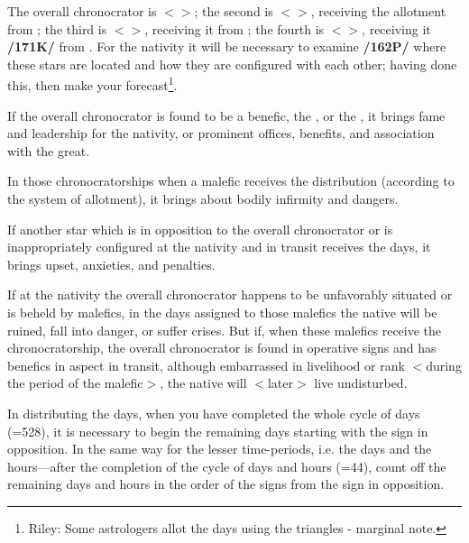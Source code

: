 The overall chronocrator is \Jupiter\xspace $<$\Pisces$>$; the second is \Mercury\xspace $<$\Gemini$>$, receiving the allotment from \Jupiter; the third is \Mars $<$\Scorpio$>$, receiving it from \Mercury; the fourth is \Venus $<$\Taurus$>$, receiving it \textbf{/171K/} from \Mars. For the nativity it will be necessary to examine \textbf{/162P/} where these stars are located and how they are configured with each other; having done this, then make your forecast\footnote{Riley: Some astrologers allot the days using the triangles - marginal note.}.

If the overall chronocrator is found to be a benefic, the \Sun, or the \Moon, it brings fame and leadership for the nativity, or prominent offices, benefits, and association with the great. 

In those chronocratorships when a malefic receives the distribution (according to the system of allotment), it brings about bodily infirmity and dangers. 

If another star which is in opposition to the overall chronocrator or is inappropriately configured at the nativity and in transit receives the days, it brings upset, anxieties, and penalties. 

If at the nativity the overall chronocrator happens to be unfavorably situated or is beheld by malefics, in the days assigned to those malefics the native will be ruined, fall into danger, or suffer crises. But if, when these malefics receive the chronocratorship, the overall chronocrator is found in operative signs and has benefics in aspect in transit, although embarrassed in livelihood or rank $<$during the period of the malefic$>$, the native will $<$later$>$ live undisturbed.

In distributing the days, when you have completed the whole cycle of days (=528), it is necessary to begin the remaining days starting with the sign in opposition. In the same way for the lesser time-periods, i.e. the days and the hours—after the completion of the cycle of days and hours (=44), count off the
remaining days and hours in the order of the signs from the sign in opposition.

\newpage
